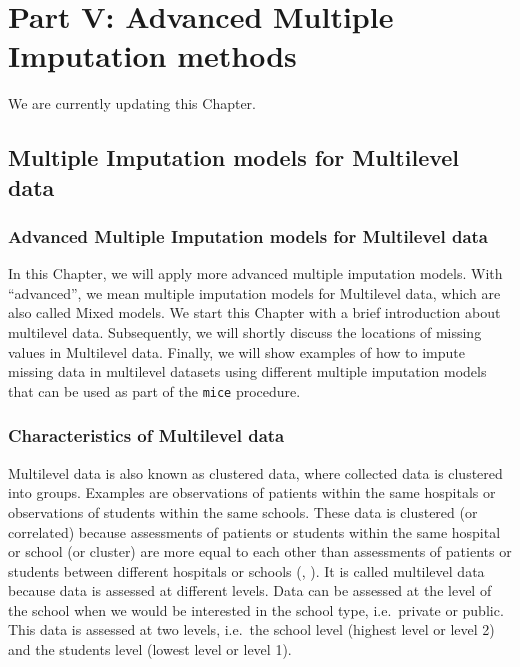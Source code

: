 \documentclass[
]{book}
\begin{document}
\hypertarget{part-part-v-advanced-multiple-imputation-methods}{%
\part{Part V: Advanced Multiple Imputation methods}\label{part-part-v-advanced-multiple-imputation-methods}}

We are currently updating this Chapter.

\hypertarget{multiple-imputation-models-for-multilevel-data}{%
\chapter{Multiple Imputation models for Multilevel data}\label{multiple-imputation-models-for-multilevel-data}}

\hypertarget{advanced-multiple-imputation-models-for-multilevel-data}{%
\section{Advanced Multiple Imputation models for Multilevel data}\label{advanced-multiple-imputation-models-for-multilevel-data}}

In this Chapter, we will apply more advanced multiple imputation models. With ``advanced'', we mean multiple imputation models for Multilevel data, which are also called Mixed models. We start this Chapter with a brief introduction about multilevel data. Subsequently, we will shortly discuss the locations of missing values in Multilevel data. Finally, we will show examples of how to impute missing data in multilevel datasets using different multiple imputation models that can be used as part of the \texttt{mice} procedure.

\hypertarget{characteristics-of-multilevel-data}{%
\section{Characteristics of Multilevel data}\label{characteristics-of-multilevel-data}}

Multilevel data is also known as clustered data, where collected data is clustered into groups. Examples are observations of patients within the same hospitals or observations of students within the same schools. These data is clustered (or correlated) because assessments of patients or students within the same hospital or school (or cluster) are more equal to each other than assessments of patients or students between different hospitals or schools (\citet{twisk2006appliedmultilevelanalysis}, \citet{hox2018multilevelanalysis}). It is called multilevel data because data is assessed at different levels. Data can be assessed at the level of the school when we would be interested in the school type, i.e.~private or public. This data is assessed at two levels, i.e.~the school level (highest level or level 2) and the students level (lowest level or level 1).
\end{document}
